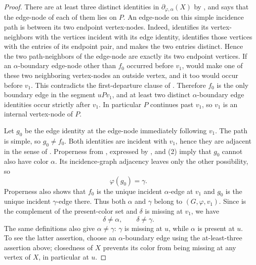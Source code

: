 \begin{proof}
There are at least three distinct identities in
$\partial_{\varphi,\alpha}(X)$ by
, and
 says that the edge-node of
each of them lies on $P$.  An edge-node on this simple incidence path is
between its two endpoint vertex-nodes.  Indeed,
 identifies its vertex-neighbors with the
vertices incident with its edge identity,  identifies
those vertices with the entries of its endpoint pair, and
 makes the two entries distinct.  Hence the
two path-neighbors of the edge-node are exactly its two endpoint vertices.
If an $\alpha$-boundary edge-node other than $f_0$ occurred before $v_1$,
 would make one of these two neighboring
vertex-nodes an outside vertex, and it too would occur before $v_1$.
This contradicts the first-departure clause of
.  Therefore $f_0$ is the only boundary
edge in the segment $uPv_1$, and at least two distinct
$\alpha$-boundary edge identities occur strictly after $v_1$.  In
particular $P$ continues past $v_1$, so $v_1$ is an internal vertex-node
of $P$.

Let $g_0$ be the edge identity at the edge-node immediately following
$v_1$.  The path is simple, so $g_0\ne f_0$.  Both identities are
incident with $v_1$, hence they are adjacent in the sense of
.  Properness from , expressed by
, and (2) imply that $g_0$ cannot also have
color $\alpha$.  Its incidence-graph adjacency leaves only the other
possibility, so
\[
 \varphi(g_0)=\gamma. \tag{3}
\]
Properness also shows that $f_0$ is the unique incident $\alpha$-edge at
$v_1$ and $g_0$ is the unique incident $\gamma$-edge there.  Thus both
$\alpha$ and $\gamma$ belong to
$(G,\varphi,v_1)$.  Since
 is the complement of the present-color set and
$\delta$ is missing at $v_1$, we have
\[
 \delta\ne\alpha,\qquad \delta\ne\gamma. \tag{4}
\]
The same definitions also give $\alpha\ne\gamma$: $\gamma$ is missing at
$u$, while $\alpha$ is present at $u$.  To see the latter assertion,
choose an $\alpha$-boundary edge using the at-least-three assertion above;
closedness of $X$ prevents its color from being missing at any vertex of
$X$, in particular at $u$.


\end{proof}
